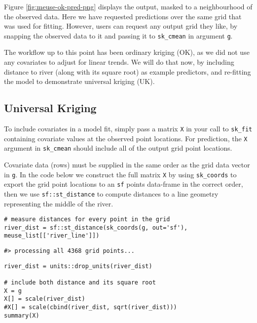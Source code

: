 Figure \ref{fig:meuse-ok-pred-png} displays the output, masked to a neighbourhood of the observed data. Here we have requested predictions over the same grid that was used for fitting. However, users can request any output grid they like, by snapping the observed data to it and passing it to \texttt{sk\_cmean} in argument \texttt{g}.

The workflow up to this point has been ordinary kriging (OK), as we did not use any covariates to adjust for linear trends. We will do that now, by including distance to river (along with its square root) as example predictors, and re-fitting the model to demonstrate universal kriging (UK).

\hypertarget{universal-kriging}{%
\subsection{Universal Kriging}\label{universal-kriging}}

To include covariates in a model fit, simply pass a matrix \texttt{X} in your call to \texttt{sk\_fit} containing covariate values at the observed point locations. For prediction, the \texttt{X} argument in \texttt{sk\_cmean} should include all of the output grid point locations.

Covariate data (rows) must be supplied in the same order as the grid data vector in \texttt{g}. In the code below we construct the full matrix \texttt{X} by using \texttt{sk\_coords} to export the grid point locations to an \texttt{sf} points data-frame in the correct order, then we use \texttt{sf::st\_distance} to compute distances to a line geometry representing the middle of the river.

\begin{verbatim}
# measure distances for every point in the grid
river_dist = sf::st_distance(sk_coords(g, out='sf'), meuse_list[['river_line']])
\end{verbatim}

\begin{verbatim}
#> processing all 4368 grid points...
\end{verbatim}

\begin{verbatim}
river_dist = units::drop_units(river_dist)

# include both distance and its square root
X = g
X[] = scale(river_dist)
#X[] = scale(cbind(river_dist, sqrt(river_dist)))
summary(X)
\end{verbatim}

